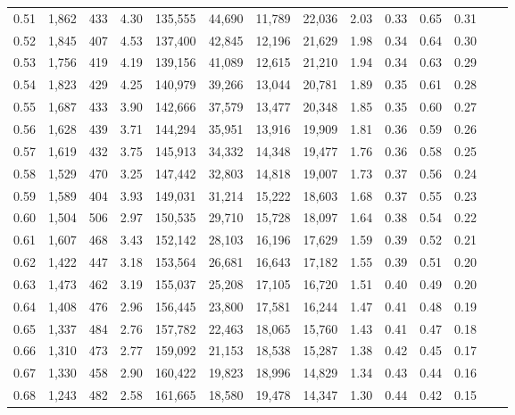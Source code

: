 \begin{tabular}{rrrrrrrrrrrrrr}
0.51 &  1,862 &  433 &    4.30 &  135,555 &   44,690 &  11,789 &  22,036 &  2.03 &  0.33 &  0.65 &      0.31 \\
0.52 &  1,845 &  407 &    4.53 &  137,400 &   42,845 &  12,196 &  21,629 &  1.98 &  0.34 &  0.64 &      0.30 \\
0.53 &  1,756 &  419 &    4.19 &  139,156 &   41,089 &  12,615 &  21,210 &  1.94 &  0.34 &  0.63 &      0.29 \\
0.54 &  1,823 &  429 &    4.25 &  140,979 &   39,266 &  13,044 &  20,781 &  1.89 &  0.35 &  0.61 &      0.28 \\
0.55 &  1,687 &  433 &    3.90 &  142,666 &   37,579 &  13,477 &  20,348 &  1.85 &  0.35 &  0.60 &      0.27 \\
0.56 &  1,628 &  439 &    3.71 &  144,294 &   35,951 &  13,916 &  19,909 &  1.81 &  0.36 &  0.59 &      0.26 \\
0.57 &  1,619 &  432 &    3.75 &  145,913 &   34,332 &  14,348 &  19,477 &  1.76 &  0.36 &  0.58 &      0.25 \\
0.58 &  1,529 &  470 &    3.25 &  147,442 &   32,803 &  14,818 &  19,007 &  1.73 &  0.37 &  0.56 &      0.24 \\
0.59 &  1,589 &  404 &    3.93 &  149,031 &   31,214 &  15,222 &  18,603 &  1.68 &  0.37 &  0.55 &      0.23 \\
0.60 &  1,504 &  506 &    2.97 &  150,535 &   29,710 &  15,728 &  18,097 &  1.64 &  0.38 &  0.54 &      0.22 \\
0.61 &  1,607 &  468 &    3.43 &  152,142 &   28,103 &  16,196 &  17,629 &  1.59 &  0.39 &  0.52 &      0.21 \\
0.62 &  1,422 &  447 &    3.18 &  153,564 &   26,681 &  16,643 &  17,182 &  1.55 &  0.39 &  0.51 &      0.20 \\
0.63 &  1,473 &  462 &    3.19 &  155,037 &   25,208 &  17,105 &  16,720 &  1.51 &  0.40 &  0.49 &      0.20 \\
0.64 &  1,408 &  476 &    2.96 &  156,445 &   23,800 &  17,581 &  16,244 &  1.47 &  0.41 &  0.48 &      0.19 \\
0.65 &  1,337 &  484 &    2.76 &  157,782 &   22,463 &  18,065 &  15,760 &  1.43 &  0.41 &  0.47 &      0.18 \\
0.66 &  1,310 &  473 &    2.77 &  159,092 &   21,153 &  18,538 &  15,287 &  1.38 &  0.42 &  0.45 &      0.17 \\
0.67 &  1,330 &  458 &    2.90 &  160,422 &   19,823 &  18,996 &  14,829 &  1.34 &  0.43 &  0.44 &      0.16 \\
0.68 &  1,243 &  482 &    2.58 &  161,665 &   18,580 &  19,478 &  14,347 &  1.30 &  0.44 &  0.42 &      0.15 \\

\end{tabular}
